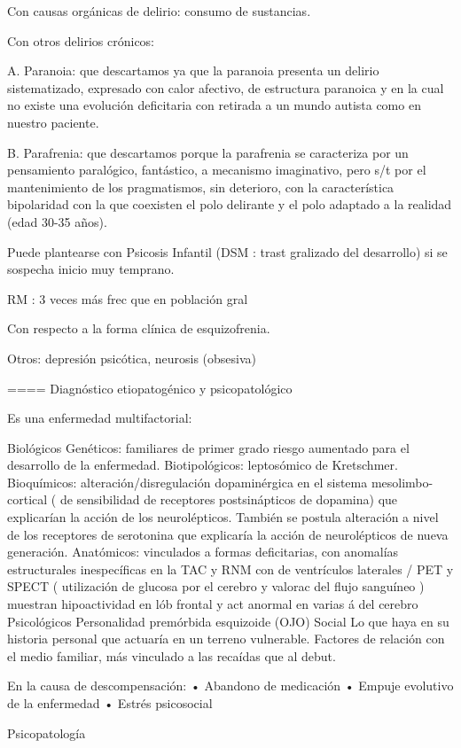 Con causas orgánicas de delirio: consumo de sustancias.

Con otros delirios crónicos:

A. Paranoia: que descartamos ya que la paranoia presenta un delirio sistematizado, expresado con calor afectivo, de estructura paranoica y en la cual no existe una evolución deficitaria con retirada a un mundo autista como en nuestro paciente.

B. Parafrenia: que descartamos porque la parafrenia se caracteriza por un pensamiento paralógico, fantástico, a mecanismo imaginativo, pero s/t por el mantenimiento de los pragmatismos, sin deterioro, con la característica bipolaridad con la que coexisten el polo delirante y el polo adaptado a la realidad (edad 30-35 años).

Puede plantearse con Psicosis Infantil (DSM : trast gralizado del desarrollo) si se sospecha inicio muy temprano.

RM : 3 veces más frec que en población gral

Con respecto a la forma clínica de esquizofrenia.

Otros: depresión psicótica, neurosis (obsesiva)

==== Diagnóstico etiopatogénico y psicopatológico

Es una enfermedad multifactorial:

Biológicos Genéticos: familiares de primer grado riesgo aumentado para el desarrollo de la enfermedad. Biotipológicos: leptosómico de Kretschmer. Bioquímicos: alteración/disregulación dopaminérgica en el sistema mesolimbo-cortical ( de sensibilidad de receptores postsinápticos de dopamina) que explicarían la acción de los neurolépticos. También se postula alteración a nivel de los receptores de serotonina que explicaría la acción de neurolépticos de nueva generación. Anatómicos: vinculados a formas deficitarias, con anomalías estructurales inespecíficas en la TAC y RNM con de ventrículos laterales / PET y SPECT ( utilización de glucosa por el cerebro y valorac del flujo sanguíneo ) muestran hipoactividad en lób frontal y act anormal en varias á del cerebro Psicológicos Personalidad premórbida esquizoide (OJO) Social Lo que haya en su historia personal que actuaría en un terreno vulnerable. Factores de relación con el medio familiar, más vinculado a las recaídas que al debut.

En la causa de descompensación: • Abandono de medicación • Empuje evolutivo de la enfermedad • Estrés psicosocial

Psicopatología

